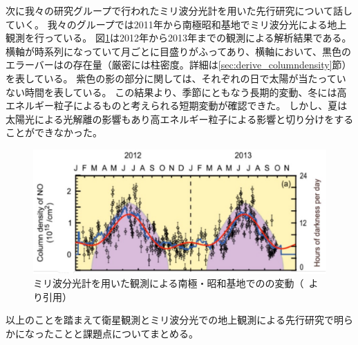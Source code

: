 次に我々の研究グループで行われたミリ波分光計を用いた先行研究について話していく。
我々のグループでは2011年から南極昭和基地でミリ波分光による地上観測を行っている。
図\ref{fig:isono2014ground_fig5a}は2012年から2013年までの観測による解析結果である。
横軸が時系列になっていて月ごとに目盛りがふってあり、横軸において、黒色のエラーバーはの存在量（厳密には柱密度。詳細は\ref{sec:derive_columndensity}節）を表している。
紫色の影の部分に関しては、それぞれの日で太陽が当たっていない時間を表している。
この結果より、季節にともなう長期的変動、冬には高エネルギー粒子によるものと考えられる短期変動が確認できた。
しかし、夏は太陽光による光解離の影響もあり高エネルギー粒子による影響と切り分けをすることができなかった。
\begin{figure}[htbp]
    \centering
    \includegraphics[width=\linewidth]{master_thesis_contents/master_thesis_fig/isono2014ground_fig5a.pdf}
    \caption{ミリ波分光計を用いた観測による南極・昭和基地でのの変動（~\cite{isono2014ground}より引用）}
    \label{fig:isono2014ground_fig5a}
\end{figure}
以上のことを踏まえて衛星観測とミリ波分光での地上観測による先行研究で明らかになったことと課題点についてまとめる。
\clearpage
